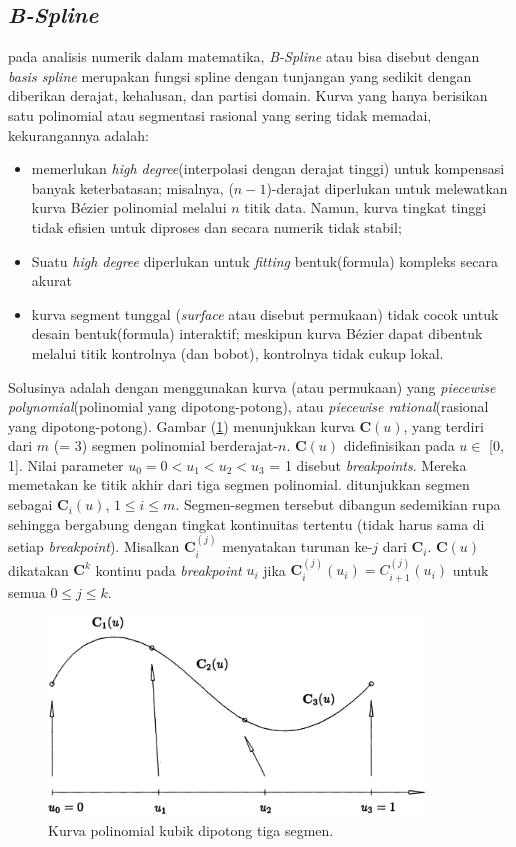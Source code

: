 \subsection{\emph{B-Spline}}

pada analisis numerik dalam matematika, 
\textit{B-Spline} atau bisa disebut dengan 
\textit{basis spline} merupakan fungsi spline dengan 
tunjangan yang sedikit dengan diberikan derajat, kehalusan, 
dan partisi domain.
Kurva yang hanya berisikan satu polinomial atau 
segmentasi rasional yang sering tidak memadai, 
kekurangannya adalah:
\begin{itemize}
	\item memerlukan \textit{high degree}(interpolasi 
	dengan derajat tinggi) untuk kompensasi  
	banyak keterbatasan; misalnya, ($n - 1$)-derajat 
	diperlukan untuk melewatkan kurva Bézier polinomial 
	melalui $n$ titik data. Namun, kurva tingkat tinggi 
	tidak efisien untuk diproses dan secara numerik tidak stabil;
	\item Suatu \textit{high degree} diperlukan untuk 
	\textit{fitting} bentuk(formula) kompleks secara akurat
	\item kurva segment tunggal (\textit{surface} atau 
	disebut permukaan) tidak cocok untuk desain 
	bentuk(formula) interaktif; meskipun kurva Bézier dapat 
	dibentuk melalui titik kontrolnya (dan bobot), 
	kontrolnya tidak cukup lokal.
\end{itemize}

Solusinya adalah dengan menggunakan kurva (atau permukaan) 
yang \textit{piecewise polynomial}(polinomial yang dipotong-potong), 
atau \textit{piecewise rational}(rasional yang dipotong-potong). 
Gambar (\ref{gambar:Kurva_dipotong_tiga}) 
menunjukkan kurva $\textbf{C}(u)$, yang terdiri 
dari $m$ (= 3) segmen polinomial  berderajat-$n$. 
$\textbf{C}(u)$ didefinisikan pada $u\in$ [0, 1]. 
Nilai parameter $u_0 = 0 < u_1 < u_2 < u_3$ = 1 disebut 
\textit{breakpoints}. Mereka memetakan ke titik akhir dari 
tiga segmen polinomial. ditunjukkan segmen 
sebagai $\textbf{C}_{i}(u)$, $1 \leq i \leq m$. 
Segmen-segmen tersebut 
dibangun sedemikian rupa sehingga bergabung dengan 
tingkat kontinuitas tertentu (tidak harus sama di 
setiap \textit{breakpoint}). Misalkan 
$\textbf{C}_{i}^{(j)}$ menyatakan 
turunan ke-$j$ dari $\textbf{C}_i$. $\textbf{C}(u)$ 
dikatakan $\textbf{C}^k$ kontinu pada \textit{breakpoint} 
$u_i$ jika $\textbf{C}_{i}^{(j)}(u_i) = C_{i+1}^{(j)}(u_i)$ 
untuk semua $0 \leq j \leq k$.
\begin{figure}[H]
	\centering
	\includegraphics[keepaspectratio, width=10cm]{gambar/Interpolasi/pic1.png} 
	\caption{Kurva polinomial kubik dipotong tiga segmen.}
	\label{gambar:Kurva_dipotong_tiga}
\end{figure}

